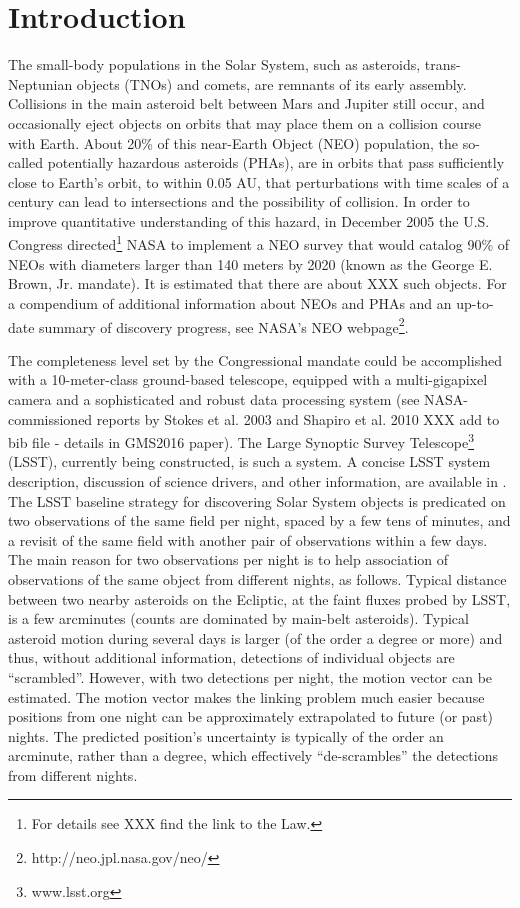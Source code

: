 
\section{Introduction}

The small-body populations in the Solar System, such as asteroids, trans-Neptunian objects (TNOs) 
and comets, are remnants of its early assembly. Collisions in the main asteroid belt between Mars and 
Jupiter still occur, and occasionally eject objects on orbits that may place them on a collision course 
with Earth. About 20\% of this near-Earth Object (NEO) population, the so-called potentially hazardous 
asteroids (PHAs), are in orbits that pass sufficiently close to Earth's orbit, to within 0.05 AU, that 
perturbations with time scales of a century can lead to intersections and the possibility of collision. 
In order to improve quantitative understanding of this hazard, in December 2005 the U.S. Congress
directed\footnote{For details see XXX find the link to the Law.} NASA to implement a NEO survey that 
would catalog 90\% of NEOs with diameters larger than 140 meters by 2020 (known as the George 
E. Brown, Jr. mandate). It is estimated that there are about XXX such objects. For a compendium of 
additional information about NEOs and PHAs and an up-to-date summary of discovery progress, 
see NASA's NEO webpage\footnote{http://neo.jpl.nasa.gov/neo/}. 

The completeness level set by the Congressional mandate could be accomplished with a 10-meter-class 
ground-based telescope, equipped with a multi-gigapixel camera and a sophisticated and robust data 
processing system (see NASA-commissioned reports by Stokes et al. 2003 and Shapiro et al. 2010 
XXX add to bib file - details in GMS2016 paper). The Large Synoptic Survey Telescope\footnote{www.lsst.org} (LSST), currently being 
constructed, is such a system. A concise LSST system description, discussion of science drivers, and other 
information, are available in \cite{LSSToverview}. The LSST baseline strategy for discovering Solar System 
objects is predicated on two observations of the same field per night, spaced by a few tens of minutes, and 
a revisit of the same field with another pair of observations within a few days. The main reason for two
observations per night is to help association of observations of the same object from different nights, 
as follows. Typical distance between two nearby asteroids on the Ecliptic, at the faint fluxes probed by 
LSST, is a few arcminutes (counts are dominated by main-belt asteroids). Typical asteroid motion
during several days is larger (of the order a degree or more) and thus, without additional information, 
detections of individual objects are ``scrambled''. However, with two detections per night, the motion 
vector can be estimated. The motion vector makes the linking problem much easier because
positions from one night can be approximately extrapolated to future (or past) nights. The predicted
position's uncertainty is typically of the order an arcminute, rather than a degree, which effectively 
``de-scrambles'' the detections from different nights.  

